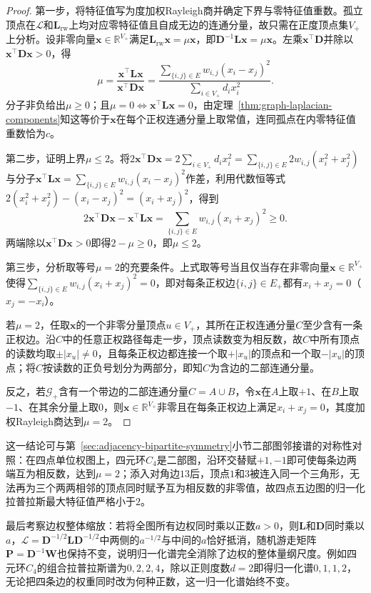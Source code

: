 \begin{proof}
第一步，将特征值写为度加权Rayleigh商并确定下界与零特征值重数。孤立顶点在$\mathcal L$和$\bm L_{\mathrm{rw}}$上均对应零特征值且自成无边的连通分量，故只需在正度顶点集$V_+$上分析。设非零向量$\bm x\in\mathbb R^{V_+}$满足$\bm L_{\mathrm{rw}}\bm x=\mu\bm x$，即$\bm D^{-1}\bm L\bm x=\mu\bm x$。左乘$\bm x^\top\bm D$并除以$\bm x^\top\bm D\bm x>0$，得
\[
  \mu=\frac{\bm x^\top\bm L\bm x}{\bm x^\top\bm D\bm x}
  =\frac{\sum_{\{i,j\}\in E}w_{i,j}(x_i-x_j)^2}{\sum_{i\in V_+}d_i x_i^2}.
\]
分子非负给出$\mu\geq 0$；且$\mu=0\iff\bm x^\top\bm L\bm x=0$，由定理~\ref{thm:graph-laplacian-components}知这等价于$\bm x$在每个正权连通分量上取常值，连同孤点在内零特征值重数恰为$c$。

第二步，证明上界$\mu\leq 2$。将$2\bm x^\top\bm D\bm x=2\sum_{i\in V_+}d_i x_i^2=\sum_{\{i,j\}\in E}2w_{i,j}(x_i^2+x_j^2)$与分子$\bm x^\top\bm L\bm x=\sum_{\{i,j\}\in E}w_{i,j}(x_i-x_j)^2$作差，利用代数恒等式$2(x_i^2+x_j^2)-(x_i-x_j)^2=(x_i+x_j)^2$，得到
\[
  2\bm x^\top\bm D\bm x-\bm x^\top\bm L\bm x
  =\sum_{\{i,j\}\in E}w_{i,j}(x_i+x_j)^2\geq 0.
\]
两端除以$\bm x^\top\bm D\bm x>0$即得$2-\mu\geq 0$，即$\mu\leq 2$。

第三步，分析取等号$\mu=2$的充要条件。上式取等号当且仅当存在非零向量$\bm x\in\mathbb R^{V_+}$使得$\sum_{\{i,j\}\in E}w_{i,j}(x_i+x_j)^2=0$，即对每条正权边$\{i,j\}\in E_+$都有$x_i+x_j=0$（$x_j=-x_i$）。

若$\mu=2$，任取$\bm x$的一个非零分量顶点$u\in V_+$，其所在正权连通分量$C$至少含有一条正权边。沿$C$中的任意正权路径每走一步，顶点读数变为相反数，故$C$中所有顶点的读数均取$\pm|x_u|\neq 0$，且每条正权边都连接一个取$+|x_u|$的顶点和一个取$-|x_u|$的顶点；将$C$按读数的正负号划分为两部分，即知$C$为含边的二部连通分量。

反之，若$\mathcal G_+$含有一个带边的二部连通分量$C=A\cup B$，令$\bm x$在$A$上取$+1$、在$B$上取$-1$、在其余分量上取$0$，则$\bm x\in\mathbb R^{V_+}$非零且在每条正权边上满足$x_i+x_j=0$，其度加权Rayleigh商达到$\mu=2$。
\end{proof}

这一结论可与第~\ref{sec:adjacency-bipartite-symmetry}小节二部图邻接谱的对称性对照：在四点单位权图上，四元环$C_4$是二部图，沿环交替赋$+1,-1$即可使每条边两端互为相反数，达到$\mu=2$；添入对角边$13$后，顶点$1$和$3$被连入同一个三角形，无法再为三个两两相邻的顶点同时赋予互为相反数的非零值，故四点五边图的归一化拉普拉斯最大特征值严格小于$2$。

最后考察边权整体缩放：若将全图所有边权同时乘以正数$a>0$，则$\bm L$和$\bm D$同时乘以$a$，$\mathcal L=\bm D^{-1/2}\bm L\bm D^{-1/2}$中两侧的$a^{-1/2}$与中间的$a$恰好抵消，随机游走矩阵$\bm P=\bm D^{-1}\bm W$也保持不变，说明归一化谱完全消除了边权的整体量纲尺度。例如四元环$C_4$的组合拉普拉斯谱为$0,2,2,4$，除以正则度数$d=2$即得归一化谱$0,1,1,2$，无论把四条边的权重同时改为何种正数，这一归一化谱始终不变。
